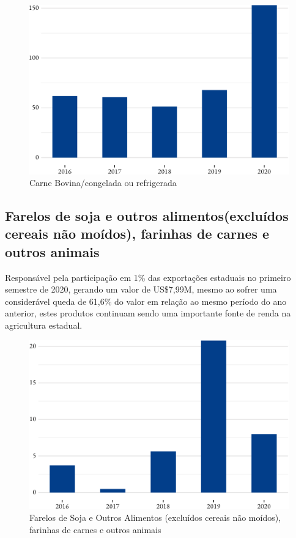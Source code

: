 \begin{figure}[h] 
	\caption{Carne Bovina/congelada ou refrigerada}
	\includegraphics{fig/carne1-1.pdf}
\end{figure}

\subsection {Farelos de soja e outros alimentos(excluídos cereais não moídos), farinhas de carnes e outros animais}
Responsável pela participação em 1\% das exportações estaduais no primeiro semestre de 2020, gerando um valor de US\$7,99M, mesmo ao sofrer uma considerável queda de 61,6\% do valor em relação ao mesmo período do ano anterior, estes produtos continuam sendo uma importante fonte de renda na agricultura estadual. 

\begin{figure}[h] 
	\caption{Farelos de Soja e Outros Alimentos (excluídos cereais não moídos), farinhas de carnes e outros animais}
	\includegraphics{fig/farelos1-1.pdf}
\end{figure}

